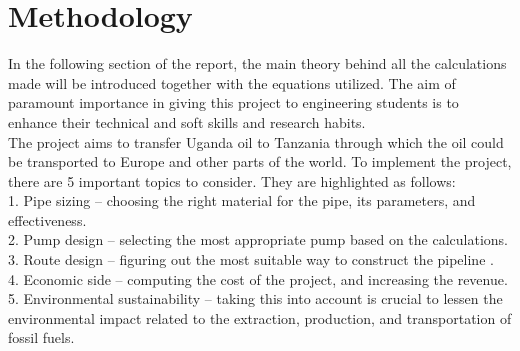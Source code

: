 \documentclass[12pt]{article}
\begin{document}
      \section{Methodology}
      {\fontsize{12pt}{12pt}

      \hspace*{1em} In the following section of the report, the main theory behind all the calculations made will be introduced together with the equations utilized. The aim of paramount importance in giving this project to engineering students is to enhance their technical and soft skills and research habits. \\
      \hspace*{1em} The project aims to transfer Uganda oil to Tanzania through which the oil could be transported to Europe and other parts of the world. To implement the project, there are 5 important topics to consider. They are highlighted as follows: \\
      \hspace*{1em}1.	Pipe sizing – choosing the right material for the pipe, its parameters, and effectiveness. \\
      \hspace*{1em}2.	Pump design – selecting the most appropriate pump based on the calculations. \\
      \hspace*{1em}3.	Route design – figuring out the most suitable way to construct the pipeline . \\
      \hspace*{1em}4.	Economic side – computing the cost of the project, and increasing the revenue. \\
      \hspace*{1em}5.	Environmental sustainability – taking this into account is crucial to lessen the environmental impact related to the extraction, production, and transportation of fossil fuels. \\

      }
\end{document}
